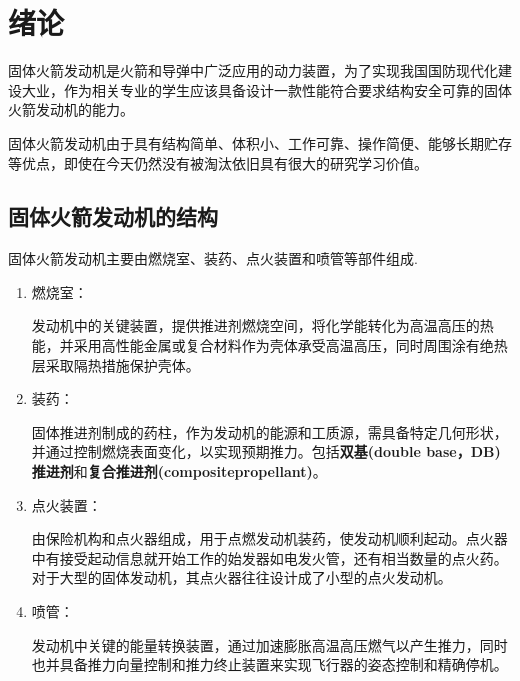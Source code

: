 \chapter{绪论}
固体火箭发动机是火箭和导弹中广泛应用的动力装置，为了实现我国国防现代化建设大业，作为相关专业的学生应该具备设计一款性能符合要求结构安全可靠的固体火箭发动机的能力。

固体火箭发动机由于具有结构简单、体积小、工作可靠、操作简便、能够长期贮存等优点，即使在今天仍然没有被淘汰依旧具有很大的研究学习价值。
\section{固体火箭发动机的结构}
固体火箭发动机主要由燃烧室、装药、点火装置和喷管等部件组成.
\begin{enumerate}[leftmargin=2em]
  \item 燃烧室：
  
  发动机中的关键装置，提供推进剂燃烧空间，将化学能转化为高温高压的热能，并采用高性能金属或复合材料作为壳体承受高温高压，同时周围涂有绝热层采取隔热措施保护壳体。
  \item 装药：
  
  固体推进剂制成的药柱，作为发动机的能源和工质源，需具备特定几何形状，并通过控制燃烧表面变化，以实现预期推力。包括\textbf{双基(double base，DB)推进剂}和\textbf{复合推进剂(compositepropellant)}。

  \item 点火装置：
  
  由保险机构和点火器组成，用于点燃发动机装药，使发动机顺利起动。点火器中有接受起动信息就开始工作的始发器如电发火管，还有相当数量的点火药。对于大型的固体发动机，其点火器往往设计成了小型的点火发动机。

  \item 喷管：
  
  发动机中关键的能量转换装置，通过加速膨胀高温高压燃气以产生推力，同时也并具备推力向量控制和推力终止装置来实现飞行器的姿态控制和精确停机。
\end{enumerate}




